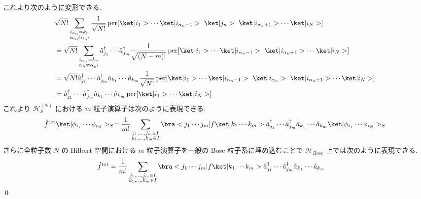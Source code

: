\documentclass[uplatex,dvipdfmx,a4paper,11pt]{jlreq}
\makeatletter
\DeclareMathOperator{\per}{per}
\newcommand{\HH}{\mathcal{H}}
\numberwithin{equation}{section}
\theoremstyle{definition}
\renewenvironment{proof}[1][\proofname]{\par
  \normalfont
  \topsep6\p@\@plus6\p@ \trivlist
  \item[\hskip\labelsep{\bfseries #1}\@addpunct{\bfseries}]\ignorespaces\quad\par
}{%
  \qed\endtrivlist\@endpefalse
}
\renewcommand\proofname{証明}
\makeatother
\begin{document}
\begin{proof}
\begin{align}
  \end{align}
  これより次のように変形できる.
  \begin{align}
     & \sqrt{N!}\sum_{\substack{i_{\alpha_n} = k_n                                                                                                                                                                        \\ \alpha_n\neq\alpha_{n'}}}\frac{1}{\sqrt{N!}}\per[\ket|i_1>\cdots\ket|i_{\alpha_n-1}> \ \ket|j_n> \ \ket|i_{\alpha_n+1}>\cdots\ket|i_N>] \\
     & = \sqrt{N!}\sum_{\substack{i_{\alpha_n} = k_n                                                                                                                                                                      \\ \alpha_n\neq\alpha_{n'}}}\hat{a}_{j_1}^\dagger\cdots\hat{a}_{j_m}^\dagger\frac{1}{\sqrt{(N - m)!}}\per[\ket|i_1>\cdots\ket|i_{\alpha_n-1}> \ \ket|i_{\alpha_n+1}>\cdots\ket|i_N>] \\
     & = \sqrt{N!}\hat{a}_{j_1}^\dagger\cdots\hat{a}_{j_m}^\dagger\hat{a}_{k_1}\cdots\hat{a}_{k_m}\frac{1}{\sqrt{N!}}\per[\ket|i_1>\cdots\ket|i_{\alpha_n-1}> \ \ket|i_{\alpha_n}> \ \ket|i_{\alpha_n+1}>\cdots\ket|i_N>] \\
     & = \hat{a}_{j_1}^\dagger\cdots\hat{a}_{j_m}^\dagger\hat{a}_{k_1}\cdots\hat{a}_{k_m}\per[\ket|i_1>\cdots\ket|i_N>]
  \end{align}
  これより $\HH_S^{(N)}$ における $m$ 粒子演算子は次のように表現できる.
  \begin{align}
    \hat{f}^{\mathrm{tot}}\ket|\phi_{i_1}\cdots\phi_{i_N}>_S = \frac{1}{m!}\sum_{\substack{j_1,\ldots,j_m\in I \\ k_1,\ldots,k_m\in I}}\bra<j_1\cdots j_m|f\ket|k_1\cdots k_m>\hat{a}_{j_1}^\dagger\cdots\hat{a}_{j_m}^\dagger\hat{a}_{k_1}\cdots\hat{a}_{k_m}\ket|\phi_{i_1}\cdots\phi_{i_N}>_S
  \end{align}
  さらに全粒子数 $N$ の Hilbert 空間における $m$ 粒子演算子を一般の Bose 粒子系に埋め込むことで $\HH_{Bose}$ 上では次のように表現できる.
  \begin{align}
    \hat{f}^{\mathrm{tot}} & = \frac{1}{m!}\sum_{\substack{j_1,\ldots,j_m\in I \\ k_1,\ldots,k_m\in I}}\bra<j_1\cdots j_m|f\ket|k_1\cdots k_m>\hat{a}_{j_1}^\dagger\cdots\hat{a}_{j_m}^\dagger\hat{a}_{k_1}\cdots\hat{a}_{k_m}
  \end{align}
\end{proof}
\end{document}
